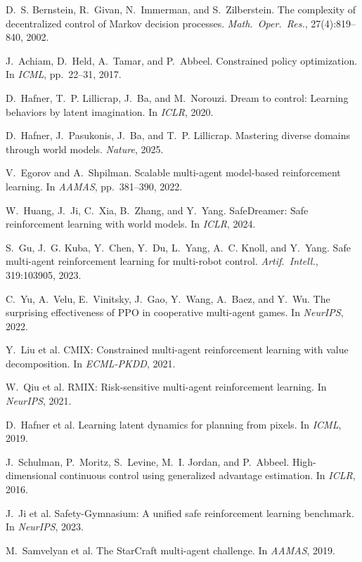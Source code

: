\documentclass[12pt,a4paper]{article}
\begin{document}
\begin{enumerate}[leftmargin=1.5em, label={[\arabic*]}]
\item D.~S. Bernstein, R.~Givan, N.~Immerman, and S.~Zilberstein. The complexity of decentralized control of Markov decision processes. \emph{Math.\ Oper.\ Res.}, 27(4):819--840, 2002.

\item J.~Achiam, D.~Held, A.~Tamar, and P.~Abbeel. Constrained policy optimization. In \emph{ICML}, pp.\ 22--31, 2017.

\item D.~Hafner, T.~P. Lillicrap, J.~Ba, and M.~Norouzi. Dream to control: Learning behaviors by latent imagination. In \emph{ICLR}, 2020.

\item D.~Hafner, J.~Pasukonis, J.~Ba, and T.~P. Lillicrap. Mastering diverse domains through world models. \emph{Nature}, 2025.

\item V.~Egorov and A.~Shpilman. Scalable multi-agent model-based reinforcement learning. In \emph{AAMAS}, pp.\ 381--390, 2022.

\item W.~Huang, J.~Ji, C.~Xia, B.~Zhang, and Y.~Yang. SafeDreamer: Safe reinforcement learning with world models. In \emph{ICLR}, 2024.

\item S.~Gu, J.~G. Kuba, Y.~Chen, Y.~Du, L.~Yang, A.~C. Knoll, and Y.~Yang. Safe multi-agent reinforcement learning for multi-robot control. \emph{Artif.\ Intell.}, 319:103905, 2023.

\item C.~Yu, A.~Velu, E.~Vinitsky, J.~Gao, Y.~Wang, A.~Baez, and Y.~Wu. The surprising effectiveness of PPO in cooperative multi-agent games. In \emph{NeurIPS}, 2022.

\item Y.~Liu et al. CMIX: Constrained multi-agent reinforcement learning with value decomposition. In \emph{ECML-PKDD}, 2021.

\item W.~Qiu et al. RMIX: Risk-sensitive multi-agent reinforcement learning. In \emph{NeurIPS}, 2021.

\item D.~Hafner et al. Learning latent dynamics for planning from pixels. In \emph{ICML}, 2019.

\item J.~Schulman, P.~Moritz, S.~Levine, M.~I. Jordan, and P.~Abbeel. High-dimensional continuous control using generalized advantage estimation. In \emph{ICLR}, 2016.

\item J.~Ji et al. Safety-Gymnasium: A unified safe reinforcement learning benchmark. In \emph{NeurIPS}, 2023.

\item M.~Samvelyan et al. The StarCraft multi-agent challenge. In \emph{AAMAS}, 2019.
\end{enumerate}
\end{document}
